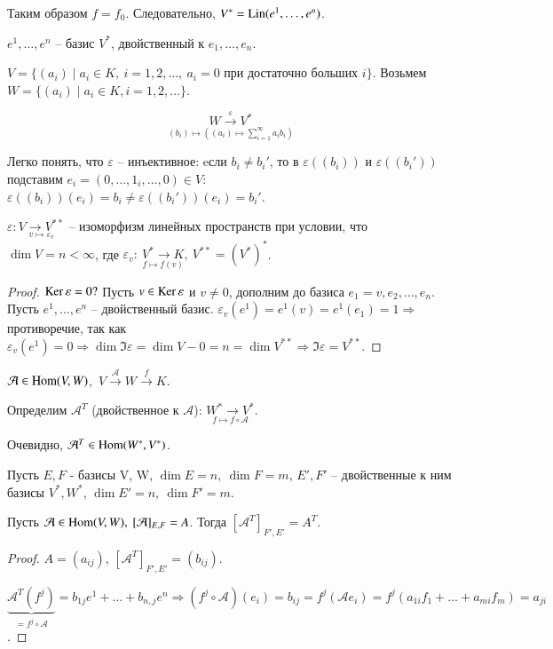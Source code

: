 \documentclass[main]{subfiles}
\begin{document}
Таким образом $f = f_0$. Следовательно, $V^* = \operatorname{Lin}(e^1,\dots,e^n)$.

$e^1, \ldots,e^n$ -- базис $V^*$, двойственный к $e_1,\dots, e_n$.
\begin{example}
    $V = \{(a_i) \mid a_i \in K, \ i = 1,2,\dots, \ a_i = 0 \text{ при достаточно больших } i \}$.
    Возьмем $W=\{(a_i) \mid a_i \in K, i = 1,2,\dots \}$.

    \[\underset{(b_i)\mapsto((a_i)\mapsto \sum_{i = 1}^{\infty}a_ib_i)}{W \overset{\varepsilon}{\longrightarrow} V^*}\]

    Легко понять, что $\varepsilon$ -- инъективное: eсли $b_i \neq b_i'$, то в $\varepsilon((b_i))$ и $\varepsilon((b_i'))$ подставим $e_i = (0, \ldots, 1_i, \ldots, 0) \in V$: $\varepsilon((b_i))(e_i) = b_i \neq \varepsilon((b_i'))(e_i) = b_i'$.
\end{example}

\begin{proposition}
    $\varepsilon: \underset{v \mapsto \varepsilon_v}{V \to V^{**}}$ -- изоморфизм линейных пространств при условии,  что $\dim V=n < \infty$, где $\varepsilon_v: \ \underset{f \mapsto f(v)}{V^* \rightarrow K}, \
    V^{**} = (V^*)^*$.
\end{proposition}

\begin{proof}
    $\operatorname{Ker}\varepsilon = 0 ?$
    Пусть $v \in \operatorname{Ker}\varepsilon$ и $v \neq 0$, дополним до базиса $e_1=v, e_2,\dots,e_n$.
    Пусть $e^1,\dots, e^n$ -- двойственный базис.
    $\varepsilon_v(e^1)=e^1(v) = e^1(e_1) = 1 \Rightarrow$ противоречие, так как $\varepsilon_v(e^1) = 0
        \Rightarrow \dim \Im \varepsilon = \dim V - 0 = n = \dim V^{**} \Rightarrow \Im \varepsilon = V^{**}$.
\end{proof}

$\mathcal{A} \in \operatorname{Hom}(V,W)$,\ $V \overset{\mathcal{A}}{\to} W \overset{f}{\to} K$.

Определим $\mathcal{A}^T$ (двойственное к $\mathcal{A}$): $\underset{f \mapsto f \circ \mathcal{A}}{W^* \to V^*}$.

Очевидно, $\mathcal{A}^T \in \operatorname{Hom}(W^*,V^*)$.

\begin{proposition}
    Пусть $E,F$ - базисы V, W, $\dim E = n, \ \dim F = m$, $E', F'$ -- двойственные к ним базисы $V^*, W^*$, $\dim E' = n, \ \dim F' = m$.

    Пусть $\mca \in \Hom(V,W), \ [\mathcal{A}]_{E,F} = A$. Тогда $[\mathcal{A}^T]_{F',E'} = A^T$.
\end{proposition}

\begin{proof}
    $A = (a_{ij})$, $[\mathcal{A}^T]_{F',E'} = (b_{ij})$.

    $\underbrace{\mathcal{A}^T(f^j)}_{=f^j\circ \mathcal{A}} = b_{1j}e^1+\dots+b_{n,j}e^n \Rightarrow  (f^j \circ \mathcal{A})(e_i) = b_{ij} = f^j(\mathcal{A}e_i)=f^j(a_{1i}f_1+\dots+a_{mi}f_m)=a_{ji}$.
\end{proof}
\end{document}
